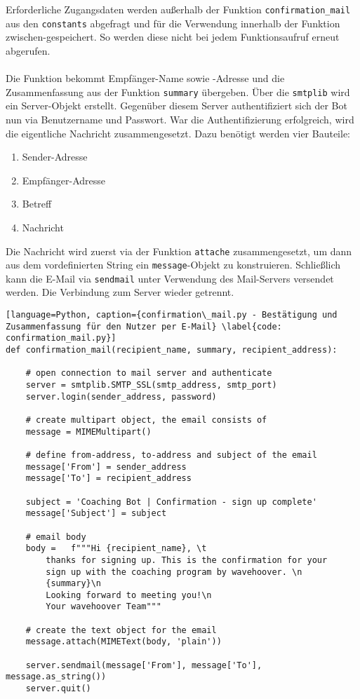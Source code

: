             Erforderliche Zugangsdaten werden außerhalb der Funktion \verb|confirmation_mail| aus den \verb|constants| abgefragt und für die Verwendung innerhalb der Funktion zwischen-gespeichert. So werden diese nicht bei jedem Funktionsaufruf erneut abgerufen.\\
            \\
            Die Funktion bekommt Empfänger-Name sowie -Adresse und die Zusammenfassung aus der Funktion \verb|summary| übergeben. Über die \verb|smtplib| wird ein Server-Objekt erstellt. Gegenüber diesem Server authentifiziert sich der Bot nun via Benutzername und Passwort. War die Authentifizierung erfolgreich, wird die eigentliche Nachricht zusammengesetzt. Dazu benötigt werden vier Bauteile: 
            \begin{enumerate}
                \item Sender-Adresse
                \item Empfänger-Adresse
                \item Betreff
                \item Nachricht
            \end{enumerate}
            Die Nachricht wird zuerst via der Funktion \verb|attache| zusammengesetzt, um dann aus dem vordefinierten String ein \verb|message|-Objekt zu konstruieren. Schließlich kann die E-Mail via \verb|sendmail| unter Verwendung des Mail-Servers versendet werden. Die Verbindung zum Server wieder getrennt.

            \begin{lstlisting}[language=Python, caption={confirmation\_mail.py - Bestätigung und Zusammenfassung für den Nutzer per E-Mail} \label{code: confirmation_mail.py}]
def confirmation_mail(recipient_name, summary, recipient_address):

    # open connection to mail server and authenticate
    server = smtplib.SMTP_SSL(smtp_address, smtp_port)
    server.login(sender_address, password)

    # create multipart object, the email consists of
    message = MIMEMultipart()

    # define from-address, to-address and subject of the email
    message['From'] = sender_address
    message['To'] = recipient_address

    subject = 'Coaching Bot | Confirmation - sign up complete'
    message['Subject'] = subject

    # email body
    body =   f"""Hi {recipient_name}, \t
        thanks for signing up. This is the confirmation for your 
        sign up with the coaching program by wavehoover. \n 
        {summary}\n
        Looking forward to meeting you!\n
        Your wavehoover Team"""
    
    # create the text object for the email
    message.attach(MIMEText(body, 'plain'))

    server.sendmail(message['From'], message['To'], message.as_string())
    server.quit()
            \end{lstlisting}


